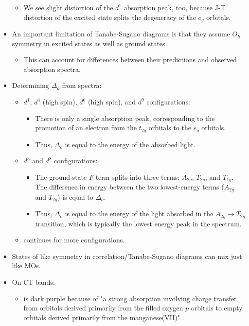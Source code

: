 \documentclass[../notes.tex]{subfiles}
\begin{document}
\begin{itemize}
\begin{itemize}
        \item We see slight distortion of the $d^1$ absorption peak, too, because J-T distortion of the excited state splits the degeneracy of the $e_g$ orbitals.
    \end{itemize}
    \item An important limitation of Tanabe-Sugano diagrams is that they assume $O_h$ symmetry in excited states as well as ground states.
    \begin{itemize}
        \item This can account for differences between their predictions and observed absorption spectra.
    \end{itemize}
    \item Determining $\Delta_o$ from spectra:
    \begin{itemize}
        \item $d^1$, $d^4$ (high spin), $d^6$ (high spin), and $d^9$ configurations:
        \begin{itemize}
            \item There is only a single absorption peak, corresponding to the promotion of an electron from the $t_{2g}$ orbitals to the $e_g$ orbitals.
            \item Thus, $\Delta_o$ is equal to the energy of the absorbed light.
        \end{itemize}
        \item $d^3$ and $d^8$ configurations:
        \begin{itemize}
            \item The ground-state $F$ term splits into three terms: $A_{2g}$, $T_{2g}$, and $T_{1g}$. The difference in energy between the two lowest-energy terms ($A_{2g}$ and $T_{2g}$) is equal to $\Delta_o$.
            \item Thus, $\Delta_o$ is equal to the energy of the light absorbed in the $A_{2g}\to T_{2g}$ transition, which is typically the lowest energy peak in the spectrum.
        \end{itemize}
        \item \textcite{bib:MiesslerFischerTarr} continues for more configurations.
    \end{itemize}
    \item States of like symmetry in correlation/Tanabe-Sugano diagrams can mix just like MOs.
    \item On CT bands:
    \begin{itemize}
        \item {} is dark purple because of "a strong absorption involving charge transfer from orbitals derived primarily from the filled oxygen $p$ orbitals to empty orbitals derived primarily from the manganese(VII)" \parencite[430]{bib:MiesslerFischerTarr}.

\end{itemize}
\end{itemize}
\end{document}
